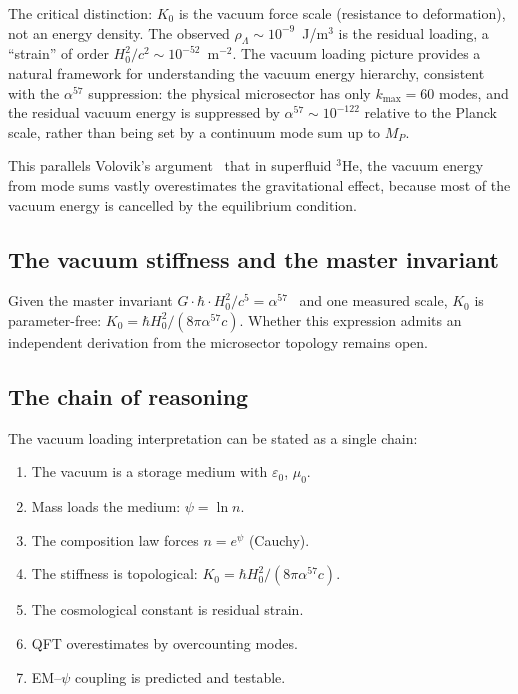\documentclass[aps,prd,twocolumn,superscriptaddress,nofootinbib]{revtex4-2}
\begin{document}
The critical distinction: $K_0$ is the vacuum force scale (resistance to
deformation), not an energy density.  The observed
$\rho_\Lambda \sim 10^{-9}$~J/m$^3$ is the residual loading, a
``strain'' of order $H_0^2/c^2 \sim 10^{-52}$~m$^{-2}$.  The vacuum
loading picture provides a natural framework for understanding the
vacuum energy hierarchy, consistent with the $\alpha^{57}$ suppression:
the physical microsector has only $k_{\max} = 60$ modes, and the
residual vacuum energy is suppressed by $\alpha^{57} \sim 10^{-122}$
relative to the Planck scale, rather than being set by a continuum
mode sum up to $M_P$.

This parallels Volovik's argument~\cite{Volovik2003} that in
superfluid $^3$He, the vacuum energy from mode sums vastly
overestimates the gravitational effect, because most of the vacuum
energy is cancelled by the equilibrium condition.

\subsection{The vacuum stiffness and the master invariant}

Given the master invariant $G\cdot\hbar\cdot H_0^2/c^5 =
\alpha^{57}$~\cite{Alcock2025AbInitio} and one measured scale, $K_0$
is parameter-free:
$K_0 = \hbar H_0^2/(8\pi\alpha^{57}c)$.  Whether this expression
admits an independent derivation from the microsector topology remains
open.

\subsection{The chain of reasoning}

The vacuum loading interpretation can be stated as a single chain:
\begin{enumerate}
\item The vacuum is a storage medium with $\varepsilon_0$, $\mu_0$.
\item Mass loads the medium: $\psi = \ln n$.
\item The composition law forces $n = e^\psi$ (Cauchy).
\item The stiffness is topological:
$K_0 = \hbar H_0^2/(8\pi\alpha^{57}c)$.
\item The cosmological constant is residual strain.
\item QFT overestimates by overcounting modes.
\item EM--$\psi$ coupling is predicted and testable.
\end{enumerate}
\end{document}
